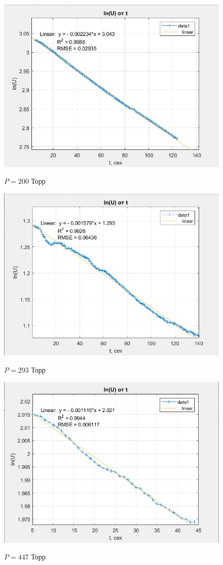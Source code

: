 \documentclass[a4paper, 12pt]{article} %
\begin{document}
\begin{figure}[h]
    \centering
    \includegraphics[width = 10.5 cm]{2gr200}
    \label{fig:vac}
    
    \begin{center}
		\caption{$P = 200$ Торр}
    \end{center}
\end{figure} 

\begin{figure}[h]
    \centering
    \includegraphics[width = 10.5 cm]{2gr293}
    \label{fig:vac}
    
    \begin{center}
		\caption{$P = 293$ Торр}
    \end{center}
\end{figure} 

\begin{figure}[h]
    \centering
    \includegraphics[width = 10.5 cm]{2gr447}
    \label{fig:vac}
    
    \begin{center}
		\caption{$P = 447$ Торр}
    \end{center}
\end{figure} 
\end{document}
